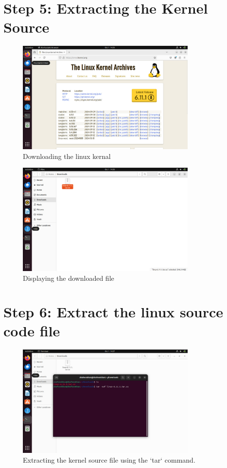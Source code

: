 \documentclass{article}
\begin{document}
\section*{Step 5: Extracting the Kernel Source}
\begin{figure}[H]
    \centering
    \includegraphics[width=0.8\textwidth]{72.jpg}
    \caption{Downloading the linux kernal}
\end{figure}
\begin{figure}[H]
    \centering
    \includegraphics[width=0.8\textwidth]{71.jpg}
    \caption{Displaying the downloaded file}
\end{figure}

\section*{Step 6: Extract the linux source code file}
\begin{figure}[H]
    \centering
    \includegraphics[width=0.8\textwidth]{70.jpg}
    \caption{Extracting the kernel source file using the `tar` command.}
\end{figure}
\end{document}
